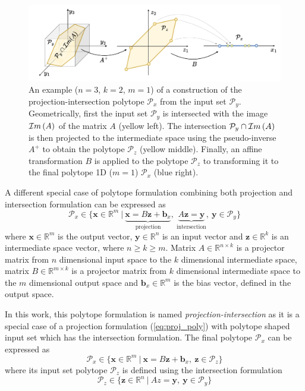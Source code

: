 \begin{figure}
    \centering
    \includegraphics[width=\linewidth]{Chapters/imgs/spec_proj_int.pdf}
    \caption{An example ($n=3$, $k=2$, $m=1$) of a construction of the projection-intersection polytope $\mathcal{P}_x$ from the input set $\mathcal{P}_y$. 
    Geometrically, first the input set $\mathcal{P}_y$ is intersected with the image $\mathcal{I}m\left(A\right)$ of the matrix $A$ (yellow left). The intersection $\mathcal{P}_y\cap\mathcal{I}m\left(A\right)$ is then projected to the intermediate space using the pseudo-inverse $A^+$ to obtain the polytope $\mathcal{P}_z$ (yellow middle). Finally, an affine transformation $B$ is applied to the polytope $\mathcal{P}_z$ to transforming it to the final polytope 1D ($m=1$) $\mathcal{P}_x$ (blue right).}
    \label{fig:proj_inter_spec}
\end{figure}
A different special case of polytope formulation combining both projection and intersection formulation can be expressed as 
\begin{equation}
    \mathcal{P}_x \in \{\bm{x}\in \mathbb{R}^m~|~ \underbrace{\bm{x} = B \bm{z} + \bm{b}_x}_{\text{projection}},~ \underbrace{A\bm{z}=\bm{y}}_{\text{intersection}},~ \bm{y} \in \mathcal{P}_y\} 
    \label{eq:proj_inter_poly}
\end{equation}
where $\bm{x}\in\mathbb{R}^m$ is the output vector, $\bm{y} \in \mathbb{R}^n$ is an input vector and $\bm{z}\in\mathbb{R}^k$ is an intermediate space vector, where $n\!\geq\!k\!\geq\!m$. Matrix $A\in \mathbb{R}^{n\times k}$ is a projector matrix from $n$ dimensional input space to the $k$ dimensional intermediate space, matrix $B\in \mathbb{R}^{m\times k}$ is a projector matrix from $k$ dimensional intermediate space to the $m$ dimensional output space and $\bm{b}_x\in\mathbb{R}^m$ is the bias vector, defined in the output space.

In this work, this polytope formulation is named \textit{projection-intersection} as it is a special case of a projection formulation (\ref{eq:proj_poly}) with polytope shaped input set which has the intersection formulation. The final polytope $\mathcal{P}_x$ can be expressed as
\begin{equation}
    \mathcal{P}_x \in \{\bm{x}\in \mathbb{R}^m~|~ \bm{x} = B\bm{z} + \bm{b}_x,~ \bm{z} \in \mathcal{P}_z\} 
\end{equation}
where its input set polytope $\mathcal{P}_z$ is defined using the intersection formulation
\begin{equation}
    \mathcal{P}_z \in \{\bm{z}\in \mathbb{R}^n~|~Az = \bm{y},~ \bm{y} \in \mathcal{P}_y\} 
\end{equation}

